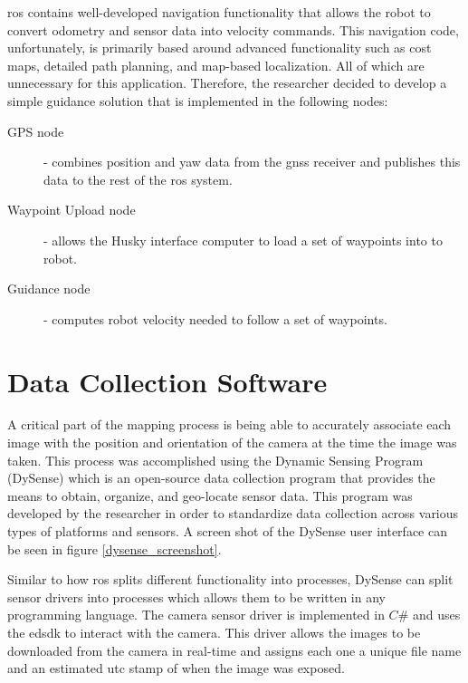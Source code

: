\ac{ros} contains well-developed navigation functionality that allows the robot to convert odometry and sensor data into velocity commands.  This navigation code, unfortunately, is primarily based around advanced functionality such as cost maps, detailed path planning, and map-based localization. All of which are unnecessary for this application.  Therefore, the researcher decided to develop a simple guidance solution that is implemented in the following nodes:

\begin{description}
\item[GPS node] - combines position and yaw data from the \ac{gnss} receiver and publishes this data to the rest of the \ac{ros} system.
\item[Waypoint Upload node] - allows the Husky interface computer to load a set of waypoints into to robot.
\item[Guidance node] - computes robot velocity needed to follow a set of waypoints. 
\end{description}

\section{Data Collection Software}
\label{system-software}

A critical part of the mapping process is being able to accurately associate each image with the position and orientation of the camera at the time the image was taken.  This process was accomplished using the Dynamic Sensing Program (DySense) which is an open-source data collection program that provides the means to obtain, organize, and geo-locate sensor data.  This program was developed by the researcher in order to standardize data collection across various types of platforms and sensors.  A screen shot of the DySense user interface can be seen in figure \ref{dysense_screenshot}.

Similar to how \ac{ros} splits different functionality into processes, DySense can split sensor drivers into processes which allows them to be written in any programming language.  The camera sensor driver is implemented in $C\#$ and uses the \ac{edsdk} to interact with the camera.  This driver allows the images to be downloaded from the camera in real-time and assigns each one a unique file name and an estimated \ac{utc} stamp of when the image was exposed.

